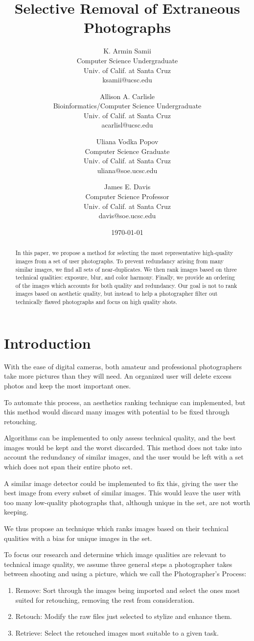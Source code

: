 \documentclass[10pt,twocolumn,letterpaper]{article}
\title{
Selective Removal of Extraneous Photographs
}
\author{
K. Armin Samii\\
Computer Science Undergraduate\\
Univ. of Calif. at Santa Cruz\\
ksamii@ucsc.edu
\and
Allison A. Carlisle\\
Bioinformatics/Computer Science Undergraduate\\
Univ. of Calif. at Santa Cruz\\
acarlisl@ucsc.edu
\and
Uliana Vodka Popov\\
Computer Science Graduate\\
Univ. of Calif. at Santa Cruz\\
uliana@soe.ucsc.edu
\and
James E. Davis\\
Computer Science Professor\\
Univ. of Calif. at Santa Cruz\\
davis@soe.ucsc.edu
}
\date{\today}
\begin{document}
\maketitle
\begin{abstract}
In this paper, we propose a method for selecting the most representative high-quality images from a set of user photographs. To prevent redundancy arising from many similar images, we find all sets of near-duplicates. We then rank images based on three technical qualities: exposure, blur, and color harmony. Finally, we provide an ordering of the images which accounts for both quality and redundancy. Our goal is not to rank images based on aesthetic quality, but instead to help a photographer filter out technically flawed photographs and focus on high quality shots.
\end{abstract}

\section{Introduction}
With the ease of digital cameras, both amateur and professional photographers take more pictures than they will need. An organized user will delete excess photos and keep the most important ones.

To automate this process, an aesthetics ranking technique can implemented, but this method would discard many images with potential to be fixed through retouching.

Algorithms can be implemented to only assess technical quality, and the best images would be kept and the worst discarded. This method does not take into account the redundancy of similar images, and the user would be left with a set which does not span their entire photo set.

A similar image detector could be implemented to fix this, giving the user the best image from every subset of similar images. This would leave the user with too many low-quality photographs that, although unique in the set, are not worth keeping.

We thus propose an technique which ranks images based on their technical qualities with a bias for unique images in the set.

To focus our research and determine which image qualities are relevant to technical image quality, we assume three general steps a photographer takes between shooting and using a picture, which we call the Photographer's Process:
\begin{enumerate}
\item Remove: Sort through the images being imported and select the ones most suited for retouching, removing the rest from consideration.
\item Retouch: Modify the raw files just selected to stylize and enhance them.
\item Retrieve: Select the retouched images most suitable to a given task.
\end{enumerate}
\end{document}

